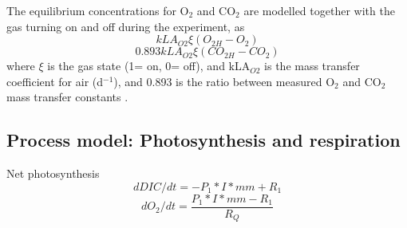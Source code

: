 \documentclass{ruthesis}
\begin{document}

The equilibrium concentrations for O$_2$ and CO$_2$ are modelled together with the gas turning on and off during the experiment, as
\begin{equation}
  kLA_{O2} \xi (O_{2H} - O_{2})
\end{equation}
\begin{equation}
0.893 kLA_{O2} \xi (CO_{2H} - CO_{2})
\end{equation}
where $\xi$ is the gas state (1= on, 0= off), and kLA$_{O2}$ is the mass transfer coefficient for air (d$^{-1}$), and 0.893 is the ratio between measured O$_2$ and CO$_2$ mass transfer constants \cite{grima1993gas}.



\subsection{Process model: Photosynthesis and respiration}

Net photosynthesis
\begin{equation}
dDIC/dt  =  -P_1*I*mm + R_1 
\end{equation}
\begin{equation} 
dO_2/dt	 =  \frac{P_1*I*mm - R_1}{R_Q}
\end{equation}
\end{document}
